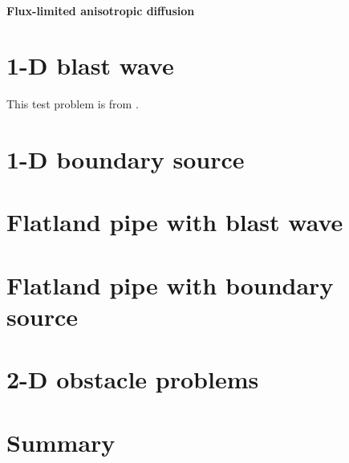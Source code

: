 \paragraph{Flux-limited anisotropic diffusion}

\section{1-D blast wave}
This test problem is from \cite{Rau2005,Ols2007}.

\section{1-D boundary source}

\section{Flatland pipe with blast wave}

\section{Flatland pipe with boundary source}

\section{2-D obstacle problems}
\cite{Mou2006}

\section{Summary}


